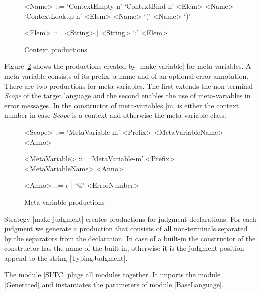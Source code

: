 
\begin{figure}
\begin{grammar}
  <Name> ::= `ContextEmpty-n'
  \alt `ContextBind-n' <Elem> <Name>
  \alt `ContextLookup-n' <Elem> <Name>
  \alt `(' <Name> `)'

  <Elem> ::= <String> | <String> `:' <Elem>
\end{grammar}
\caption{Context productions}
\label{fig:context-productions}
\end{figure}

Figure~\ref{fig:meta-variable-productions} shows the productions
created by \code|make-variable| for meta-variables. A meta-variable
consists of its prefix, a name and of an optional error
annotation. There are two productions for meta-variables. The first
extends the non-terminal \textit{Scope} of the target language and the
second enables the use of meta-variables in error messages. In the
constructor of meta-variables \code|m| is either the context number in
case \textit{Scope} is a context and otherwise the meta-variable
class.

\begin{figure}
\begin{grammar}
  <Scope> ::= `MetaVariable-m' <Prefix> <MetaVariableName> <Anno>

  <MetaVariable> ::= `MetaVariable-m' <Prefix> <MetaVariableName>
  <Anno>

  <Anno> ::= $\epsilon$ | `@' <ErrorNumber>
\end{grammar}
\caption{Meta-variable productions}
\label{fig:meta-variable-productions}
\end{figure}

Strategy \code|make-judgment| creates productions for judgment
declarations. For each judgment we generate a production that consists
of all non-terminals separated by the separators from the
declaration. In case of a built-in the constructor of the constructor
has the name of the built-in, otherwise it is the judgment position
append to the string \code|TypingJudgment|.

The module \code|SLTC| plugs all modules together. It imports the
module \code|Generated| and instantiates the parameters of module
\code|BaseLanguage|.

